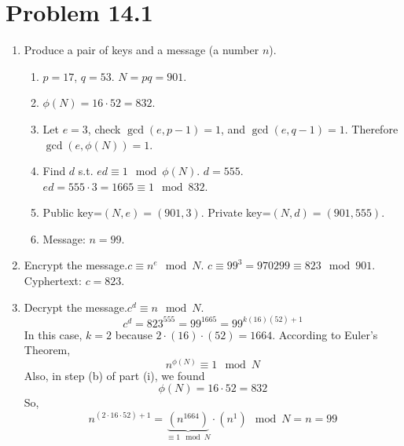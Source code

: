 \documentclass[12pt]{article}
\title{\scalebox{2}{Math 341 Final Project}}
\author{\scalebox{1.5}{Theo Koss}}
\date{December 2020}
\begin{document}
\maketitle
\section{Problem 14.1}
\begin{enumerate}[label=(\roman*)]
    \item Produce a pair of keys and a message (a number $n$).
    \begin{enumerate}[label=(\alph*)]
        \item $p=17$, $q=53$. $N=pq=901$.
        \item $\phi(N)=16\cdot52=832$.
        \item Let $e=3$, check $\gcd(e,p-1)=1$, and $\gcd(e,q-1)=1$. Therefore $\gcd(e,\phi(N))=1$.
        \item Find $d$ s.t. $ed\equiv1\mod{\phi(N)}$. $d=555$.\newline $ed=555\cdot3=1665\equiv1\mod{832}$.
        \item Public key=$(N,e)=(901,3)$. \newline Private key=$(N,d)=(901,555)$.
        \item Message: $n=99$.
    \end{enumerate}
    \item Encrypt the message.\newline $c\equiv n^e\mod{N}$. \newline $c\equiv 99^3=970299\equiv823\mod{901}$. Cyphertext: $c=823$.
    \item Decrypt the message.\newline $c^d\equiv n\mod{N}$. \newline $$c^d=823^{555}=99^{1665}=99^{k(16)(52)+1}$$ In this case, $k=2$ because $2\cdot(16)\cdot(52)=1664$. According to Euler's Theorem, $$n^{\phi(N)}\equiv1\mod{N}$$ Also, in step (b) of part (i), we found $$\phi(N)=16\cdot52=832$$ So, $$n^{(2\cdot16\cdot52)+1}=\underbrace{(n^{1664})}_{\equiv1\mod{N}}\cdot(n^1)\mod{N}=n=99$$
\end{enumerate}
\end{document}
